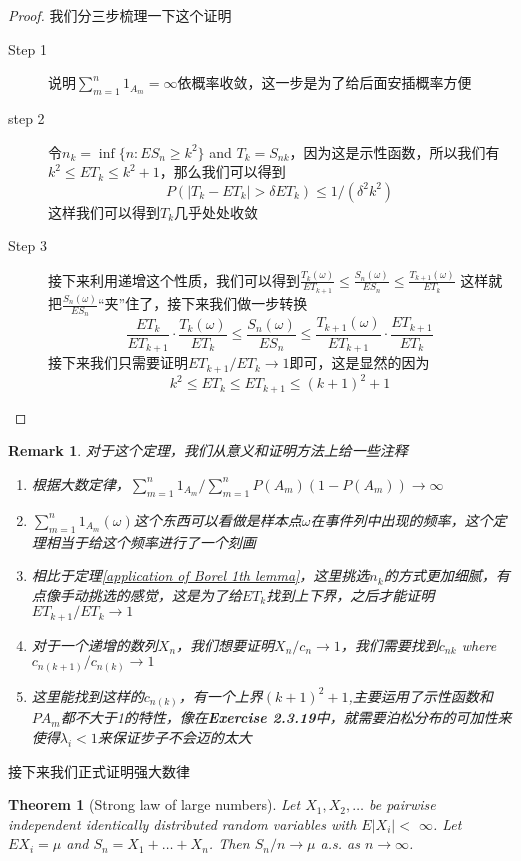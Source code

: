 \documentclass{article}
\newtheorem{theorem}{Theorem}[section]
\newtheorem*{proof}{Proof}
\newtheorem{remark}{Remark}[theorem]
\begin{document}
\begin{proof}
	我们分三步梳理一下这个证明
	\begin{description}
		\item[Step 1] 说明$\sum_{m=1}^n 1_{A_m}=\infty$依概率收敛，这一步是为了给后面安插概率方便
		\item[step 2] 令$n_k=\inf\{n:ES_n\geq k^2\}$ and $T_k=S_{nk}$，因为这是示性函数，所以我们有$k^2\leq ET_k\leq k^2+1$，那么我们可以得到
		$$
		P\left(\left|T_k-E T_k\right|>\delta E T_k\right) \leq 1 /\left(\delta^2 k^2\right)
		$$
		这样我们可以得到$T_{k}$几乎处处收敛
		\item[Step 3]接下来利用递增这个性质，我们可以得到$\frac{T_k(\omega)}{E T_{k+1}} \leq \frac{S_n(\omega)}{E S_n} \leq \frac{T_{k+1}(\omega)}{E T_k}$
		这样就把$\frac{S_n(\omega)}{ES_n}$“夹”住了，接下来我们做一步转换
		$$
		\frac{E T_k}{E T_{k+1}} \cdot \frac{T_k(\omega)}{E T_k} \leq \frac{S_n(\omega)}{E S_n} \leq \frac{T_{k+1}(\omega)}{E T_{k+1}} \cdot \frac{E T_{k+1}}{E T_k}
		$$
		接下来我们只需要证明$ET_{k+1}/ET_k\to 1$即可，这是显然的因为
		$$
		k^2 \leq E T_k \leq E T_{k+1} \leq(k+1)^2+1
		$$
	\end{description}
\end{proof}
	\begin{remark}
		对于这个定理，我们从意义和证明方法上给一些注释
		\begin{enumerate}
			\item 根据大数定律，$\sum_{m=1}^n 1_{A_m} / \sum_{m=1}^n P\left(A_m\right)\left(1-P\left(A_m\right)\right) \rightarrow \infty $
			\item $\sum_{m=1}^n 1_{A_m}(\omega)$这个东西可以看做是样本点$\omega$在事件列中出现的频率，这个定理相当于给这个频率进行了一个刻画
			\item 相比于定理\ref{application of Borel 1th lemma}，这里挑选$n_k$的方式更加细腻，有点像手动挑选的感觉，这是为了给$ET_k$找到上下界，之后才能证明$E T_{k+1} / E T_k \rightarrow 1$
			\item 对于一个递增的数列$X_n$，我们想要证明$X_n/c_n\to 1$，我们需要找到$c_{nk}$ where $c_{n(k+1)}/c_{n(k)}\to 1$
			\item 这里能找到这样的$c_{n(k)}$，有一个上界$(k+1)^2+1$,主要运用了示性函数和$P{A_m}$都不大于1的特性，像在\textbf{Exercise 2.3.19}中，就需要泊松分布的可加性来使得$\lambda_i<1$来保证步子不会迈的太大
		\end{enumerate}
	\end{remark}
接下来我们正式证明强大数律
\begin{theorem}[Strong law of large numbers]
Let $X_1, X_2, \ldots$ be pairwise independent identically distributed random variables with $E\left|X_i\right|<$ $\infty$. Let $E X_i=\mu$ and $S_n=X_1+\ldots+X_n$. Then $S_n / n \rightarrow \mu$ a.s. as $n \rightarrow \infty$.
\end{theorem}
\end{document}
